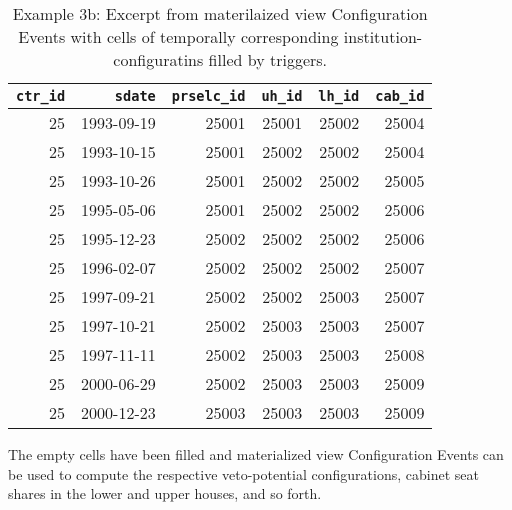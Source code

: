 \begin{table}[h!]
\centering\footnotesize
\caption*{Example 3b: Excerpt from materilaized view Configuration Events with cells of temporally corresponding institution-configuratins filled by triggers.}
\begin{tabular}{r r r r r r}
\tabularnewline\toprule\toprule
\multicolumn{1}{r}{\texttt{\smallfont ctr\_id}}	&
\multicolumn{1}{r}{\texttt{\smallfont sdate}}	&	
\multicolumn{1}{r}{\texttt{\smallfont prselc\_id}}	&
\multicolumn{1}{r}{\texttt{\smallfont uh\_id}}	&
\multicolumn{1}{r}{\texttt{\smallfont lh\_id}}	&	
\multicolumn{1}{r}{\texttt{\smallfont cab\_id}}	\\\midrule
25	&	1993-09-19	&	25001	&	25001	&	25002	&	25004	\\
25	&	1993-10-15	&	25001	&	25002	&	25002	&	25004	\\
25	&	1993-10-26	&	25001	&	25002	&	25002	&	25005	\\
25	&	1995-05-06	&	25001	&	25002	&	25002	&	25006	\\
25	&	1995-12-23	&	25002	&	25002	&	25002	&	25006	\\
25	&	1996-02-07	&	25002	&	25002	&	25002	&	25007	\\
25	&	1997-09-21	&	25002	&	25002	&	25003	&	25007	\\
25	&	1997-10-21	&	25002	&	25003	&	25003	&	25007	\\
25	&	1997-11-11	&	25002	&	25003	&	25003	&	25008	\\
25	&	2000-06-29	&	25002	&	25003	&	25003	&	25009	\\
25	&	2000-12-23	&	25003	&	25003	&	25003	&	25009	\\\bottomrule\bottomrule
\end{tabular}
\end{table}

The empty cells have been filled and materialized view Configuration Events can be used to compute the respective veto-potential configurations, cabinet seat shares in the lower and upper houses, and so forth.
